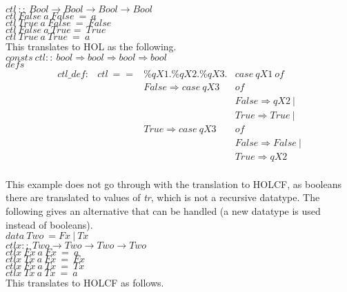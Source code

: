 \documentclass{llncs}
\begin{document}
\noindent $ctl \ :: \ Bool \to Bool \to Bool \to Bool$ \\
$ctl \ False \ a \ False \ = \ a $\\
$ctl \ True \ a \ False \ = \ False $\\
$ctl \ False \ a \ True  = \ True $\\
$ctl \ True \ a \ True \ = \ a $\\

\noindent This translates to HOL as the following.\\

\noindent $consts \ ctl :: \ bool \Rightarrow bool \Rightarrow bool \Rightarrow bool$\\

\noindent $defs$
$$\begin{array}{llll} 
ctl\_def : & ctl \ == & \% qX1. \% qX2. \% qX3. & case \ qX1 \ of \\
                                       & &  False \Rightarrow case \ qX3 & of \\
                                       & & &  False \Rightarrow qX2 \ | \\
                                       & & & True \Rightarrow True \ | \\
                                       & & True \Rightarrow case \ qX3 & of \\
                                       & & & False \Rightarrow False \ | \\
                                       & & & True \Rightarrow qX2 \\
\end{array}$$

\noindent This example does not go through with the translation to
HOLCF, as booleans there are translated to values of \emph{tr}, which
is not a recursive datatype. The following gives an alternative that
can be handled (a new datatype is used instead of booleans).\\

\noindent $data \ Two \ =  Fx \ | \ Tx $\\
\noindent $ctlx ::  \ Two \to Two \to Two \to Two $ \\
$ctlx \ Fx \ a \ Fx \ = \ a $ \\
$ctlx \ Tx \ a \ Fx \ = \ Fx $ \\
$ctlx \ Fx \ a \ Tx \ = \ Tx $ \\
$ctlx \ Tx \ a \ Tx \ = \ a $\\

\noindent This translates to HOLCF as follows.\\
\end{document}

